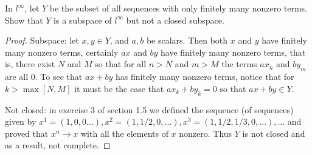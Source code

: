 \begin{exercise}{3}
In $l^\infty$, let $Y$ be the subset of all sequences with only finitely many nonzero terms. Show that $Y$ is a subspace of $l^\infty$ but not a closed subspace.
\end{exercise}
\begin{proof}
Subspace: let $x,y\in Y$, and $a,b$ be scalars. Then both $x$ and $y$ have finitely many nonzero terms, certainly $ax$ and $by$ have finitely many nonzero terms, that is, there exist $N$ and $M$ so that for all $n>N$ and $m>M$ the terms $ax_n$ and $by_m$ are all 0. To see that $ax+by$ has finitely many nonzero terms, notice that for $k>\max[N,M]$ it must be the case that $ax_k+by_k=0$ so that $ax+by\in Y$.

Not closed: in exercise 3 of section 1.5 we defined the sequence (of sequences) given by $x^1=(1,0,0\dots), x^2=(1,1/2,0,\dots), x^3=(1,1/2,1/3,0,\dots),\dots$ and proved that $x^n\to x$ with all the elements of $x$ nonzero. Thus $Y$ is not closed and as a result, not complete.
\end{proof}

